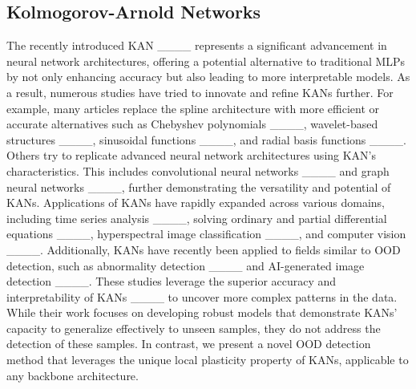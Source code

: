 \subsection{Kolmogorov-Arnold Networks}
\label{sec:kan_rel_works}

The recently introduced KAN ____ represents a significant advancement in neural network architectures, offering a potential alternative to traditional MLPs by not only enhancing accuracy but also leading to more interpretable models.
As a result, numerous studies have tried to innovate and refine KANs further. 
For example, many articles replace the spline architecture with more efficient or accurate alternatives such as Chebyshev polynomials ____, wavelet-based structures ____, sinusoidal functions ____, and radial basis functions ____. 
Others try to replicate advanced neural network architectures using KAN's characteristics. 
This includes convolutional neural networks ____ and graph neural networks ____, further demonstrating the versatility and potential of KANs. 
Applications of KANs have rapidly expanded across various domains, including time series analysis ____, solving ordinary and partial differential equations ____, hyperspectral image classification ____, and computer vision ____. 
Additionally, KANs have recently been applied to fields similar to OOD detection, such as abnormality detection ____ and AI-generated image detection ____. 
These studies leverage the superior accuracy and interpretability of KANs ____ to uncover more complex patterns in the data. 
While their work focuses on developing robust models that demonstrate KANs' capacity to generalize effectively to unseen samples, they do not address the detection of these samples. 
In contrast, we present a novel OOD detection method that leverages the unique local plasticity property of KANs, applicable to any backbone architecture.
